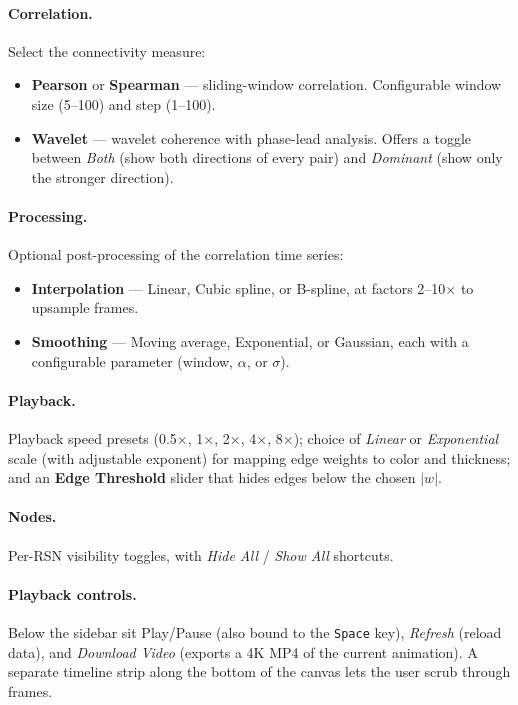 \documentclass[11pt,a4paper]{article}
\begin{document}
\paragraph{Correlation.} Select the connectivity measure:
\begin{itemize}
    \item \textbf{Pearson} or \textbf{Spearman} --- sliding-window
    correlation. Configurable window size (5--100) and step (1--100).
    \item \textbf{Wavelet} --- wavelet coherence with phase-lead
    analysis. Offers a toggle between \emph{Both} (show both directions
    of every pair) and \emph{Dominant} (show only the stronger
    direction).
\end{itemize}

\paragraph{Processing.} Optional post-processing of the correlation
time series:
\begin{itemize}
    \item \textbf{Interpolation} --- Linear, Cubic spline, or B-spline,
    at factors 2--10$\times$ to upsample frames.
    \item \textbf{Smoothing} --- Moving average, Exponential, or
    Gaussian, each with a configurable parameter (window, $\alpha$, or
    $\sigma$).
\end{itemize}

\paragraph{Playback.} Playback speed presets (0.5$\times$, 1$\times$,
2$\times$, 4$\times$, 8$\times$); choice of \emph{Linear} or
\emph{Exponential} scale (with adjustable exponent) for mapping edge
weights to color and thickness; and an \textbf{Edge Threshold} slider
that hides edges below the chosen $|w|$.

\paragraph{Nodes.} Per-RSN visibility toggles, with \emph{Hide All} /
\emph{Show All} shortcuts.

\paragraph{Playback controls.} Below the sidebar sit Play/Pause (also
bound to the \texttt{Space} key), \emph{Refresh} (reload data), and
\emph{Download Video} (exports a 4K MP4 of the current animation). A
separate timeline strip along the bottom of the canvas lets the user
scrub through frames.
\end{document}
